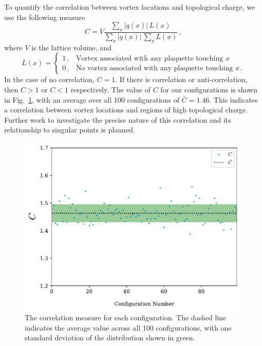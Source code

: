 To quantify the correlation between vortex locations and topological charge, we use the following measure
%
\begin{equation}
C = V\frac{\sum_x |q(x)|\,L(x)}{\sum_x |q(x)|\,\sum_x L(x)}\, ,
\label{eq:TopQCorrelation}
\end{equation}
%
where $V$ is the lattice volume, and
%
\begin{equation}
L(x) = 
\begin{cases}
1\, , & \text{Vortex associated with any plaquette touching $x$}\\
0\, , & \text{No vortex associated with any plaquette touching $x$}\, .
\end{cases}
\end{equation}
%
In the case of no correlation, $C=1$. If there is correlation or anti-correlation, then $C>1$ or $C<1$ respectively. The value of $C$ for our configurations is shown in Fig.~\ref{fig:Correlation}, with an average over all 100 configurations of $\bar{C} = 1.46$. This indicates a correlation between vortex locations and regions of high topological charge. Further work to investigate the precise nature of this correlation and its relationship to singular points is planned.\\
%
\begin{figure}[H]
\centering
\includegraphics[width=0.8\linewidth]{./Correlation.pdf}
\caption[The correlation measure for each configuration.]{\label{fig:Correlation} The correlation measure for each configuration. The dashed line indicates the average value across all 100 configurations, with one standard deviation of the distribution shown in green.}
\end{figure}
%

